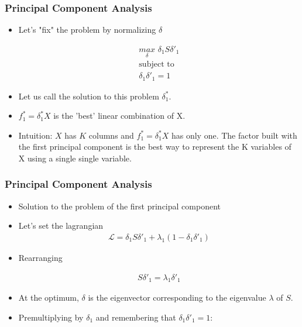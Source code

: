 \documentclass[
  shownotes,
  xcolor={svgnames},
  hyperref={colorlinks,citecolor=DarkBlue,linkcolor=DarkRed,urlcolor=DarkBlue}
  , aspectratio=169]{beamer}
\begin{document}
\begin{frame}
\frametitle{Principal Component Analysis}

\begin{itemize}
\item Let's "fix" the problem by normalizing $\delta$

\begin{align}
\underset{\delta}{max}\,\, \delta_1 S \delta'_1 \\ \nonumber
\text{subject to}  \\ \nonumber
\delta_1 \delta'_1 = 1 \nonumber
\end{align}
\item Let us call the solution to this problem $\delta^*_1$. 
\medskip
\item $f^*_1 = \delta^*_1 X$ is the 'best' linear combination of X. 
\medskip
\item Intuition: $X$ has $K$ columns and $f^*_1 = \delta^*_1 X$ has only one. The factor built with the first principal component is the best way to represent the K variables of X using a single single variable.
\end{itemize}
\end{frame}


\begin{frame}
\frametitle{Principal Component Analysis}

\begin{itemize}


\item Solution to the problem of the first principal component

\medskip
\item Let's set the lagrangian
\begin{align}
\mathcal{L} = \delta_1 S \delta'_1 + \lambda_1 (1-\delta_1\delta'_1)
\end{align}


\item Rearranging

\begin{align}
S \delta'_1 = \lambda_1 \delta'_1
\end{align}

 \item At the optimum, $\delta$ is the eigenvector corresponding to the eigenvalue $\lambda$ of $S$. 

\item Premultiplying by $\delta_1$ and  remembering that $\delta_1\delta'_1=1$:

\end{itemize}
\end{frame}
\end{document}
